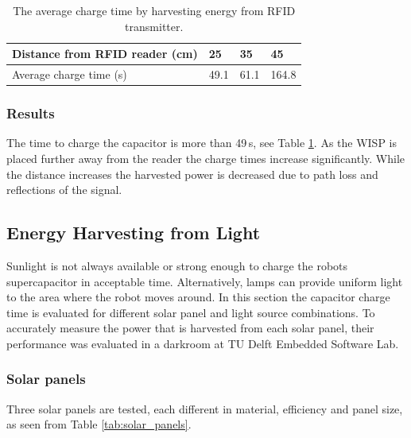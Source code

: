 \begin{table}[t]
	\centering
	\caption{The average charge time by harvesting energy from RFID transmitter.}
	\label{tab:res_rf_harvest}
	\begin{tabular}{|l||l|l|l|}
		\hline
		Distance from RFID reader (cm) & 25 & 35 & 45 \\
		\hline \hline
		Average charge time (s) & 49.1 & 61.1 & 164.8 \\
		\hline
	\end{tabular}
\end{table}

\subsubsection{Results}
The time to charge the capacitor is more than 49\,s, see Table \ref{tab:res_rf_harvest}.
As the WISP is placed further away from the reader the charge times increase significantly.
While the distance increases the harvested power is decreased due to path loss and reflections of the signal.

\subsection{Energy Harvesting from Light}
Sunlight is not always available or strong enough to charge the robots supercapacitor in acceptable time.
Alternatively, lamps can provide uniform light to the area where the robot moves around.
In this section the capacitor charge time is evaluated for different solar panel and light source combinations.
To accurately measure the power that is harvested from each solar panel, their performance was evaluated in a darkroom at TU Delft Embedded Software Lab.

\subsubsection{Solar panels}
Three solar panels are tested, each different in material, efficiency and panel size, as seen from Table \ref{tab:solar_panels}.

